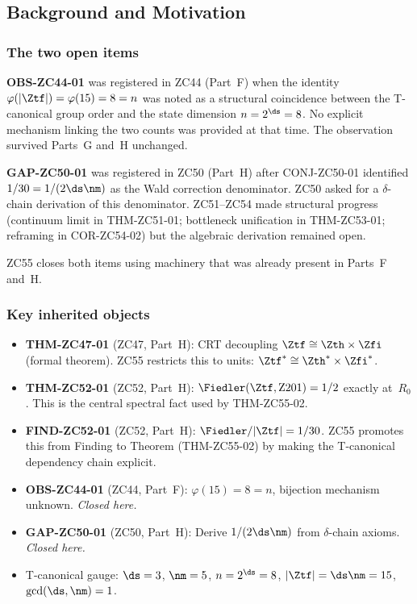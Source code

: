 \documentclass[12pt, a4paper]{article}
\begin{document}
\bigskip
\subsection{Background and Motivation}

\subsubsection{The two open items}

\textbf{OBS-ZC44-01} was registered in ZC44 (Part~F) when the
identity $\varphi(|\Ztf|)=\varphi(15)=8=n$ was noted as a
structural coincidence between the T-canonical group order and the
state dimension $n=2^{\ds}=8$.  No explicit mechanism linking the
two counts was provided at that time.  The observation survived
Parts~G and~H unchanged.

\textbf{GAP-ZC50-01} was registered in ZC50 (Part~H) after
CONJ-ZC50-01 identified $1/30=1/(2\ds\nm)$ as the Wald correction
denominator.  ZC50 asked for a $\delta$-chain derivation of this
denominator.  ZC51--ZC54 made structural progress (continuum limit
in THM-ZC51-01; bottleneck unification in THM-ZC53-01; reframing in
COR-ZC54-02) but the algebraic derivation remained open.

ZC55 closes both items using machinery that was already present in
Parts~F and~H.

\subsubsection{Key inherited objects}

\begin{itemize}[leftmargin=2em, noitemsep]
\item \textbf{THM-ZC47-01} (ZC47, Part~H):
  CRT decoupling $\Ztf\cong\Zth\times\Zfi$ (formal theorem).
  ZC55 restricts this to units: $\Ztf^*\cong\Zth^*\times\Zfi^*$.
\item \textbf{THM-ZC52-01} (ZC52, Part~H):
  $\Fiedler(\Ztf,\mathrm{Z201})=1/2$ exactly at~$R_0$.
  This is the central spectral fact used by THM-ZC55-02.
\item \textbf{FIND-ZC52-01} (ZC52, Part~H):
  $\Fiedler/|\Ztf|=1/30$.  ZC55 promotes this from Finding
  to Theorem (THM-ZC55-02) by making the T-canonical dependency
  chain explicit.
\item \textbf{OBS-ZC44-01} (ZC44, Part~F):
  $\varphi(15)=8=n$, bijection mechanism unknown.
  \emph{Closed here.}
\item \textbf{GAP-ZC50-01} (ZC50, Part~H):
  Derive $1/(2\ds\nm)$ from $\delta$-chain axioms.
  \emph{Closed here.}
\item T-canonical gauge: $\ds=3$, $\nm=5$, $n=2^{\ds}=8$,
  $|\Ztf|=\ds\nm=15$, $\gcd(\ds,\nm)=1$.
\end{itemize}
\end{document}
